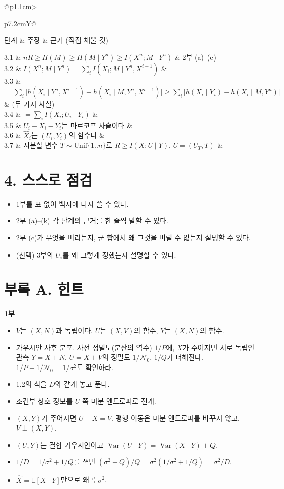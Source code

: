 \documentclass[11pt,a4paper]{article}
\makeatletter
\newcommand{\steptable}[1]{%
  \renewcommand{\arraystretch}{1.55}%
  \begin{tabularx}{\linewidth}{@{}p{1.1cm}>{\raggedright\arraybackslash}p{7.2cm}Y@{}}
  \toprule
  단계 & 주장 & 근거 (직접 채울 것)\\ \midrule
  #1
  \bottomrule
  \end{tabularx}}
\newcommand{\Var}{\operatorname{Var}}
\newcommand{\E}{\mathbb{E}}
\makeatother
\begin{document}
\steptable{
3.1 & $nR\ge H(M)\ge H(M\mid Y^n)\ge I(X^n;M\mid Y^n)$ & 2부 (a)–(c)\\
3.2 & $I(X^n;M\mid Y^n)=\sum_i I(X_i;M\mid Y^n,X^{i-1})$ & \\
3.3 & $=\sum_i\big[h(X_i\mid Y^n,X^{i-1})-h(X_i\mid M,Y^n,X^{i-1})\big]\ge\sum_i\big[h(X_i\mid Y_i)-h(X_i\mid M,Y^n)\big]$ & (두 가지 사실)\\
3.4 & $=\sum_i I(X_i;U_i\mid Y_i)$ & \\
3.5 & $U_i-X_i-Y_i$는 마르코프 사슬이다 & \\
3.6 & $\hat X_i$는 $(U_i,Y_i)$의 함수다 & \\
3.7 & 시분할 변수 $T\sim\mathrm{Unif}\{1..n\}$로 $R\ge I(X;U\mid Y)$, $U=(U_T,T)$ & \\
}

\section*{4. 스스로 점검}
\begin{itemize}[label=$\square$]
\item 1부를 표 없이 백지에 다시 쓸 수 있다.
\item 2부 (a)–(k) 각 단계의 근거를 한 줄씩 말할 수 있다.
\item 2부 (c)가 무엇을 버리는지, 군 합에서 왜 그것을 버릴 수 없는지 설명할 수 있다.
\item (선택) 3부의 $U_i$를 왜 그렇게 정했는지 설명할 수 있다.
\end{itemize}

\newpage
\section*{부록 A. 힌트}

\textbf{1부}
\begin{itemize}[leftmargin=2.2em]
\item[1.1] $V$는 $(X,N)$과 독립이다. $U$는 $(X,V)$의 함수, $Y$는 $(X,N)$의 함수.
\item[1.2] 가우시안 사후 분포. 사전 정밀도(분산의 역수) $1/P$에, $X$가 주어지면 서로 독립인 관측 $Y=X+N$, $U=X+V$의 정밀도 $1/\mathcal N_0$, $1/Q$가 더해진다. $1/P+1/\mathcal N_0=1/\sigma^2$도 확인하라.
\item[1.3] 1.2의 식을 $D$와 같게 놓고 푼다.
\item[1.4] 조건부 상호 정보를 $U$ 쪽 미분 엔트로피로 전개.
\item[1.5] $(X,Y)$가 주어지면 $U-X=V$. 평행 이동은 미분 엔트로피를 바꾸지 않고, $V\perp(X,Y)$.
\item[1.6] $(U,Y)$는 결합 가우시안이고 $\Var(U\mid Y)=\Var(X\mid Y)+Q$.
\item[1.7] $1/D=1/\sigma^2+1/Q$를 쓰면 $(\sigma^2+Q)/Q=\sigma^2(1/\sigma^2+1/Q)=\sigma^2/D$.
\item[1.8] $\hat X=\E[X\mid Y]$만으로 왜곡 $\sigma^2$.
\end{itemize}
\end{document}
